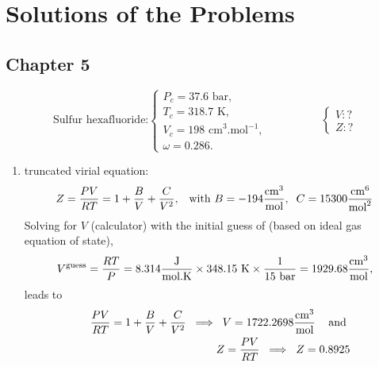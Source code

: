\chapter{Solutions of the Problems}\label{Appendix_Solutions}


\localtableofcontents



\section{Chapter 5}\label{Appendix_Solutions:Chapter5}

%
  \begin{probsol}\label{Chapter:VolumetricPropertiesPureSubstances:Problem:01:solution} %
     \begin{displaymath}
        \text{Sulfur hexafluoride:} \begin{cases}
             P_{c} = \text{37.6 bar}, \\
             T_{c} = \text{318.7 K}, \\
             V_{c} = \text{198 cm}^{3}\text{.mol}^{-1},\\
             \omega = \text{0.286}.
             \end{cases} \hspace{2cm} \begin{cases} V:? \\ Z:? \end{cases}
     \end{displaymath}
   
     \begin{enumerate}[1.]
%
        \item truncated virial equation:
            \begin{displaymath}
               Z =  \displaystyle\frac{PV}{RT}=1+\displaystyle\frac{B}{V}+\displaystyle\frac{C}{V^{2}}, \;\;\;\text{with } B=-194\displaystyle\frac{\text{cm}^{3}}{\text{mol}},\;\;C=15300 \displaystyle\frac{\text{cm}^{6}}{\text{mol}^{2}}
            \end{displaymath}
            Solving for $V$ (calculator) with the initial guess of (based on ideal gas equation of state),
            \begin{displaymath}
               V^{\text{guess}} = \displaystyle\frac{RT}{P} = 8.314 \displaystyle\frac{\text{J}}{\text{mol.K}} \times 348.15\text{ K} \times \displaystyle\frac{1}{15\text{ bar}} = 1929.68 \displaystyle\frac{\text{cm}^{3}}{\text{mol}},
            \end{displaymath}
            leads to
            \begin{eqnarray}
               &&\displaystyle\frac{PV}{RT}=1+\displaystyle\frac{B}{V}+\displaystyle\frac{C}{V^{2}} \;\;\Longrightarrow \;\; V = 1722.2698 \displaystyle\frac{\text{cm}^{3}}{\text{mol}}\;\;\;\text{ and } \nonumber \\
               && Z =  \displaystyle\frac{PV}{RT} \;\;\Longrightarrow \;\; Z = 0.8925 \nonumber
            \end{eqnarray}
%
     \end{enumerate}


  \end{probsol}

